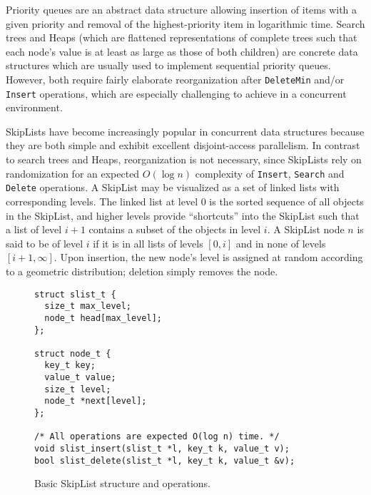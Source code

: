 \documentclass[a4paper,10pt]{article}
\begin{document}

Priority queues are an abstract data structure allowing insertion of items with a given priority
and removal of the highest-priority item in logarithmic time. Search trees and Heaps (which are 
flattened representations of complete trees such that each node's value is at least as large as
those of both children) are concrete data structures which are usually used to implement sequential
priority queues. However, both require fairly elaborate reorganization after \lstinline|DeleteMin|
and/or \lstinline|Insert| operations, which are especially challenging to achieve in a concurrent
environment. 


SkipLists \cite{pugh1990skip} have become increasingly popular in concurrent data structures because 
they are both simple and exhibit excellent disjoint-access parallelism. In contrast to
search trees and Heaps, reorganization is not necessary, since SkipLists rely on
randomization for an expected $O(\log n)$ complexity of \lstinline|Insert|, \lstinline|Search|
and \lstinline|Delete| operations.
A SkipList may be visualized as a set of linked lists with corresponding levels. The linked
list at level 0 is the sorted sequence of all objects in the SkipList,
and higher levels provide ``shortcuts''
into the SkipList such that a list of level $i + 1$ contains a subset of the objects in level
$i$. A SkipList node $n$ is said to be of level $i$ if it is in all lists of levels $[0, i]$
and in none of levels $[i + 1, \infty]$. Upon insertion, the new node's level is assigned at random
according to a geometric distribution; deletion simply removes the node.


\begin{figure}[h]
\begin{lstlisting}
struct slist_t {
  size_t max_level;
  node_t head[max_level];
};

struct node_t {
  key_t key;
  value_t value;
  size_t level;
  node_t *next[level];
};

/* All operations are expected O(log n) time. */
void slist_insert(slist_t *l, key_t k, value_t v);
bool slist_delete(slist_t *l, key_t k, value_t &v);
\end{lstlisting}
\caption{Basic SkipList structure and operations.}
\label{fig:basicsl}
\end{figure}
\end{document}
